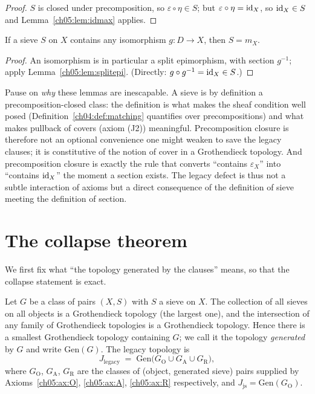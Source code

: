 \begin{proof}
$S$ is closed under precomposition, so $\varepsilon\circ\eta\in S$; but
$\varepsilon\circ\eta=\mathrm{id}_X$, so $\mathrm{id}_X\in S$ and
Lemma~\ref{ch05:lem:idmax} applies.
\end{proof}

\begin{lemma}\label{ch05:lem:iso}
If a sieve $S$ on $X$ contains any isomorphism $g:D\to X$, then $S=m_X$.
\end{lemma}

\begin{proof}
An isomorphism is in particular a split epimorphism, with section $g^{-1}$;
apply Lemma~\ref{ch05:lem:splitepi}. (Directly:
$g\circ g^{-1}=\mathrm{id}_X\in S$.)
\end{proof}

\begin{remark}\label{ch05:rem:whyblind}
Pause on \emph{why} these lemmas are inescapable. A sieve is by
definition a precomposition-closed class: the definition is what makes the
sheaf condition well posed (Definition~\ref{ch04:def:matching} quantifies
over precompositions) and what makes pullback of covers
(axiom (J2)) meaningful. Precomposition closure is therefore not an optional
convenience one might weaken to save the legacy clauses; it is constitutive
of the notion of cover in a Grothendieck topology. And precomposition closure
is exactly the rule that converts ``contains $\varepsilon_X$'' into
``contains $\mathrm{id}_X$'' the moment a section exists. The legacy defect is thus
not a subtle interaction of axioms but a direct consequence of the definition
of sieve meeting the definition of section.
\end{remark}

\section{The collapse theorem}\label{ch05:sec:collapse}

We first fix what ``the topology generated by the clauses'' means, so that
the collapse statement is exact.

\begin{definition}\label{ch05:def:generated}
Let $G$ be a class of pairs $(X,S)$ with $S$ a sieve on $X$. The collection
of all sieves on all objects is a Grothendieck topology (the largest one),
and the intersection of any family of Grothendieck topologies is a
Grothendieck topology. Hence there is a smallest Grothendieck topology
containing $G$; we call it the topology \emph{generated} by $G$ and write
$\mathrm{Gen}(G)$. The legacy topology is
\[
J_{\mathrm{legacy}}
\;=\;
\mathrm{Gen}\bigl(G_{\mathrm{O}}\cup G_{\mathrm{A}}\cup G_{\mathrm{R}}\bigr),
\]
where $G_{\mathrm{O}}$, $G_{\mathrm{A}}$, $G_{\mathrm{R}}$ are the classes of
(object, generated sieve) pairs supplied by Axioms~\ref{ch05:ax:O},
\ref{ch05:ax:A}, \ref{ch05:ax:R} respectively, and
$J_{\mathrm{js}}=\mathrm{Gen}(G_{\mathrm{O}})$.
\end{definition}

